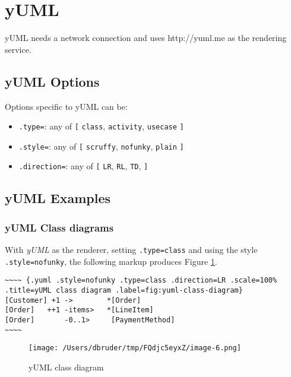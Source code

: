 \documentclass[]{article}
\begin{document}
\newpage

\section{yUML}\label{yuml}

yUML needs a network connection and uses http://yuml.me as the rendering
service.

\subsection{yUML Options}\label{yuml-options}

Options specific to yUML can be:

\begin{itemize}
\itemsep1pt\parskip0pt
\item
  \texttt{.type=}: any of \texttt{{[}} \texttt{class},
  \texttt{activity}, \texttt{usecase} \texttt{{]}}
\item
  \texttt{.style=}: any of \texttt{{[}} \texttt{scruffy},
  \texttt{nofunky}, \texttt{plain} \texttt{{]}}
\item
  \texttt{.direction=}: any of \texttt{{[}} \texttt{LR}, \texttt{RL},
  \texttt{TD}, \texttt{{]}}
\end{itemize}

\subsection{yUML Examples}\label{yuml-examples}

\subsubsection{yUML Class diagrams}\label{yuml-class-diagrams}

With \emph{yUML} as the renderer, setting \texttt{.type=class} and using
the style \texttt{.style=nofunky}, the following markup produces Figure
\ref{fig:yuml-class-diagram}.

\scriptsize

\begin{verbatim}
~~~~ {.yuml .style=nofunky .type=class .direction=LR .scale=100% .title=yUML class diagram .label=fig:yuml-class-diagram}
[Customer] +1 ->        *[Order]
[Order]   ++1 -items>   *[LineItem]
[Order]       -0..1>     [PaymentMethod]
~~~~
\end{verbatim}

\normalsize

\begin{figure}[htbp]
\centering
\texttt{[image: /Users/dbruder/tmp/FQdjc5eyxZ/image-6.png]}
\caption{yUML class diagram\label{fig:yuml-class-diagram}}
\end{figure}
\end{document}
